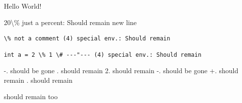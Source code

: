 \documentclass[12pt]{article}
\newcommand{\customcmd}[1]{custom:~#1}
\renewcommand{\customcmd}[1]{} %
\newif\iffoo
\begin{document}
Hello World! \cite{latex2e}%

20\textbackslash\% just a percent: Should remain
new line \\%

\begin{verbatim}
\% not a comment (4) special env.: Should remain
\end{verbatim}

\begin{lstlisting}
int a = 2 \% 1 \# ---"--- (4) special env.: Should remain
\end{lstlisting}

{} -. should be gone \fi
\iftrue 1. should remain \fi
\iffalse b. should be gone
\else 2. should remain \fi
{} -. should be gone
\else +. should remain \fi
\iftrue 3. should remain
\else c. should be gone \fi

\iffoo should be gone too \fi
\iffoo should be gone too
\else should remain too \fi

\customcmd{just a comment: Should be gone}

\end{document}
